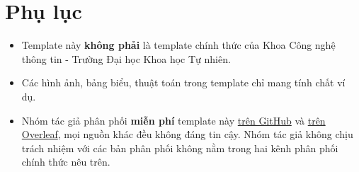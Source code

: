 \section{Phụ lục}
\begin{itemize}
\item Template này \textbf{không phải} là template chính thức của Khoa Công nghệ thông tin - Trường Đại học Khoa học Tự nhiên.
\item Các hình ảnh, bảng biểu, thuật toán trong template chỉ mang tính chất ví dụ.
\item Nhóm tác giả phân phối \textbf{miễn phí} template này \href{https://github.com/khongsomeo/latex-products}{trên GitHub} và \href{https://www.overleaf.com/latex/templates/hcmus-report-template/zyrhmsxynwqs}{trên Overleaf}, mọi nguồn khác đều không đáng tin cậy. Nhóm tác giả không chịu trách nhiệm với các bản phân phối không nằm trong hai kênh phân phối chính thức nêu trên.
\end{itemize}
